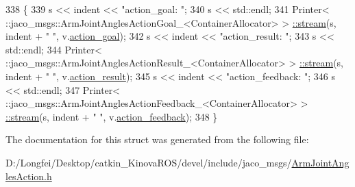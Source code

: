 \begin{DoxyCode}
338   \{
339     s << indent << \textcolor{stringliteral}{"action\_goal: "};
340     s << std::endl;
341     Printer< ::jaco\_msgs::ArmJointAnglesActionGoal\_<ContainerAllocator> >
      \hyperlink{structros_1_1message__operations_1_1Printer_3_01_1_1jaco__msgs_1_1ArmJointAnglesAction___3_01ContainerAllocator_01_4_01_4_abc59edf3b1c543e3b9a96ed0765d6e25}{::stream}(s, indent + \textcolor{stringliteral}{"  "}, v.\hyperlink{structjaco__msgs_1_1ArmJointAnglesAction___ae94e8854432290ab918b68cccf5fd63e}{action\_goal});
342     s << indent << \textcolor{stringliteral}{"action\_result: "};
343     s << std::endl;
344     Printer< ::jaco\_msgs::ArmJointAnglesActionResult\_<ContainerAllocator> >
      \hyperlink{structros_1_1message__operations_1_1Printer_3_01_1_1jaco__msgs_1_1ArmJointAnglesAction___3_01ContainerAllocator_01_4_01_4_abc59edf3b1c543e3b9a96ed0765d6e25}{::stream}(s, indent + \textcolor{stringliteral}{"  "}, v.\hyperlink{structjaco__msgs_1_1ArmJointAnglesAction___a8c8fe221e785eaf52c1651021d5cf6e9}{action\_result});
345     s << indent << \textcolor{stringliteral}{"action\_feedback: "};
346     s << std::endl;
347     Printer< ::jaco\_msgs::ArmJointAnglesActionFeedback\_<ContainerAllocator> >
      \hyperlink{structros_1_1message__operations_1_1Printer_3_01_1_1jaco__msgs_1_1ArmJointAnglesAction___3_01ContainerAllocator_01_4_01_4_abc59edf3b1c543e3b9a96ed0765d6e25}{::stream}(s, indent + \textcolor{stringliteral}{"  "}, v.\hyperlink{structjaco__msgs_1_1ArmJointAnglesAction___a4f8f0bee4654093ead1eb43103cc4d86}{action\_feedback});
348   \}
\end{DoxyCode}


The documentation for this struct was generated from the following file\+:\begin{DoxyCompactItemize}
\item 
D\+:/\+Longfei/\+Desktop/catkin\+\_\+\+Kinova\+R\+O\+S/devel/include/jaco\+\_\+msgs/\hyperlink{ArmJointAnglesAction_8h}{Arm\+Joint\+Angles\+Action.\+h}\end{DoxyCompactItemize}
